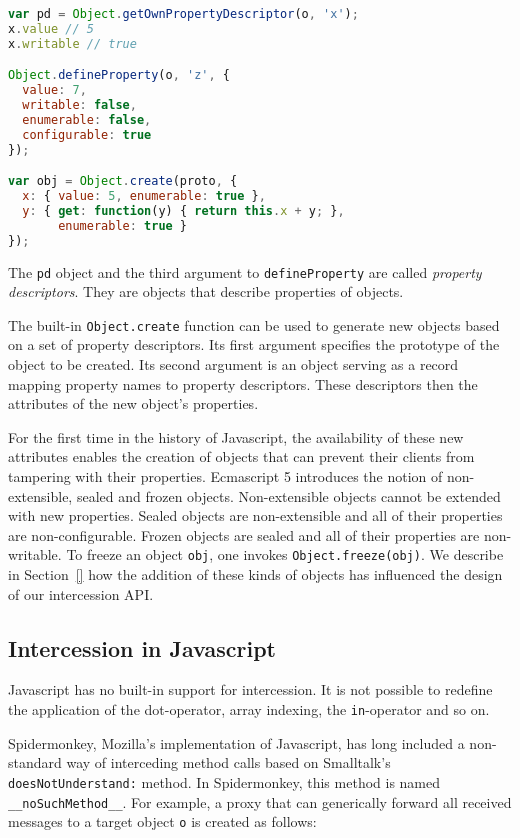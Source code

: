 \documentclass{acm_proc_article-sp}
\newcommand{\noSuchMethod}{\texttt{\_\_noSuchMethod\_\_}}
\begin{document}
\begin{lstlisting}[language=javascript]
var pd = Object.getOwnPropertyDescriptor(o, 'x');
x.value // 5
x.writable // true

Object.defineProperty(o, 'z', {
  value: 7,
  writable: false,
  enumerable: false,
  configurable: true
});

var obj = Object.create(proto, {
  x: { value: 5, enumerable: true },
  y: { get: function(y) { return this.x + y; },
       enumerable: true }
});
\end{lstlisting}

The \texttt{pd} object and the third argument to \texttt{defineProperty} are called \emph{property descriptors}. They are objects that describe properties of objects.

The built-in \texttt{Object.create} function can be used to generate new objects based on a set of property descriptors. Its first argument specifies the prototype of the object to be created. Its second argument is an object serving as a record mapping property names to property descriptors. These descriptors then the attributes of the new object's properties.

For the first time in the history of Javascript, the availability of these new attributes enables the creation of objects that can prevent their clients from tampering with their properties. Ecmascript 5 introduces the notion of non-extensible, sealed and frozen objects. Non-extensible objects cannot be extended with new properties. Sealed objects are non-extensible and all of their properties are non-configurable. Frozen objects are sealed and all of their properties are non-writable. To freeze an object \texttt{obj}, one invokes \texttt{Object.freeze(obj)}. We describe in Section~\ref{} how the addition of these kinds of objects has influenced the design of our intercession API.

\subsection{Intercession in Javascript}
\label{sub:intercession_in_javascript}

Javascript has no built-in support for intercession. It is not possible to redefine the application of the dot-operator, array indexing, the \texttt{in}-operator and so on.

Spidermonkey, Mozilla's implementation of Javascript, has long included a non-standard way of interceding method calls based on Smalltalk's \texttt{doesNotUnderstand:} method. In Spidermonkey, this method is named \noSuchMethod{}. For example, a proxy that can generically forward all received messages to a target object \texttt{o} is created as follows:
\end{document}

